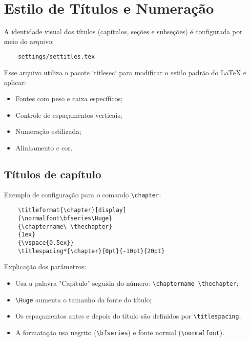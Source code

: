 \chapter{Estilo de Títulos e Numeração}

A identidade visual dos títulos (capítulos, seções e subseções) é configurada por meio do arquivo:

\begin{verbatim}
	settings/settitles.tex
\end{verbatim}

Esse arquivo utiliza o pacote `titlesec` para modificar o estilo padrão do LaTeX e aplicar:

\begin{itemize}
	\item Fontes com peso e caixa específicos;
	\item Controle de espaçamentos verticais;
	\item Numeração estilizada;
	\item Alinhamento e cor.
\end{itemize}

\section{Títulos de capítulo}

Exemplo de configuração para o comando \verb|\chapter|:

\begin{verbatim}
	\titleformat{\chapter}[display]
	{\normalfont\bfseries\Huge}
	{\chaptername\ \thechapter}
	{1ex}
	{\vspace{0.5ex}}
	\titlespacing*{\chapter}{0pt}{-10pt}{20pt}
\end{verbatim}

Explicação dos parâmetros:

\begin{itemize}
	\item Usa a palavra "Capítulo" seguida do número: \verb|\chaptername \thechapter|;
	\item \verb|\Huge| aumenta o tamanho da fonte do título;
	\item Os espaçamentos antes e depois do título são definidos por \verb|\titlespacing|;
	\item A formatação usa negrito (\verb|\bfseries|) e fonte normal (\verb|\normalfont|).
\end{itemize}

